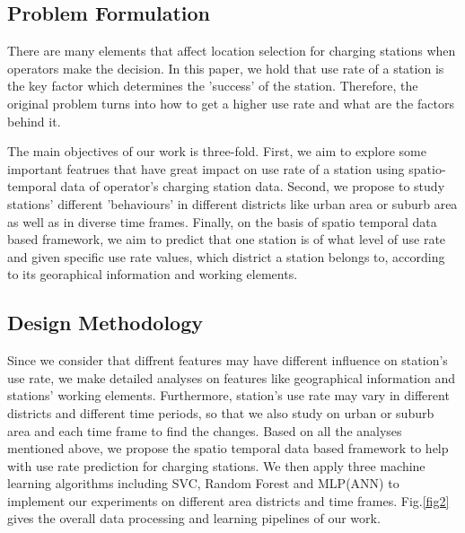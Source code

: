\subsection{Problem Formulation}
There are many elements that affect location selection for charging stations when operators make the decision. In this paper, we hold that use rate of a station is the key factor which determines the 'success' of the station. Therefore, the original problem turns into how to get a higher use rate and what are the factors behind it. 

The main objectives of our work is three-fold. First, we aim to explore some important featrues that have great impact on use rate of a station using spatio-temporal data of operator's charging station data. Second, we propose to study stations' different 'behaviours' in different districts like urban area or suburb area as well as in diverse time frames. Finally, on the basis of spatio temporal data based framework, we aim to predict that one station is of what level of use rate and given specific use rate values, which district a station belongs to, according to its georaphical information and working elements.

\subsection{Design Methodology}
Since we consider that diffrent features may have different influence on station's use rate, we make detailed analyses on features like geographical information and stations' working elements. Furthermore, station's use rate may vary in different districts and different time periods, so that we also study on urban or suburb area and each time frame to find the changes. Based on all the analyses mentioned above, we propose the spatio temporal data based framework to help with use rate prediction for charging stations. We then apply three machine learning algorithms including SVC, Random Forest and MLP(ANN) to implement our experiments on different area districts and time frames. Fig.\ref{fig2} gives the overall data processing and learning pipelines of our work.
